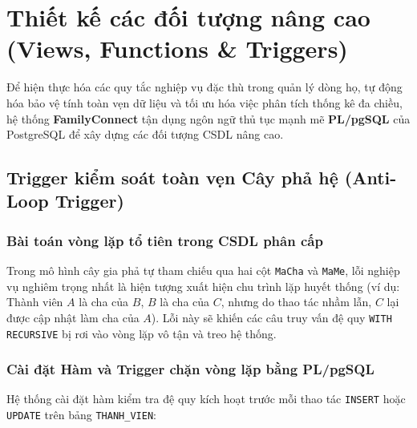 \section{Thiết kế các đối tượng nâng cao (Views, Functions \& Triggers)}
\label{sec:3_4_doi_tuong_nang_cao}

Để hiện thực hóa các quy tắc nghiệp vụ đặc thù trong quản lý dòng họ, tự động hóa bảo vệ tính toàn vẹn dữ liệu và tối ưu hóa việc phân tích thống kê đa chiều, hệ thống \textbf{FamilyConnect} tận dụng ngôn ngữ thủ tục mạnh mẽ \textbf{PL/pgSQL} của PostgreSQL để xây dựng các đối tượng CSDL nâng cao.

\subsection{Trigger kiểm soát toàn vẹn Cây phả hệ (Anti-Loop Trigger)}

\subsubsection{Bài toán vòng lặp tổ tiên trong CSDL phân cấp}
Trong mô hình cây gia phả tự tham chiếu qua hai cột \texttt{MaCha} và \texttt{MaMe}, lỗi nghiệp vụ nghiêm trọng nhất là hiện tượng xuất hiện chu trình lặp huyết thống (ví dụ: Thành viên $A$ là cha của $B$, $B$ là cha của $C$, nhưng do thao tác nhầm lẫn, $C$ lại được cập nhật làm cha của $A$). Lỗi này sẽ khiến các câu truy vấn đệ quy \texttt{WITH RECURSIVE} bị rơi vào vòng lặp vô tận và treo hệ thống.

\subsubsection{Cài đặt Hàm và Trigger chặn vòng lặp bằng PL/pgSQL}
Hệ thống cài đặt hàm kiểm tra đệ quy kích hoạt trước mỗi thao tác \texttt{INSERT} hoặc \texttt{UPDATE} trên bảng \texttt{THANH\_VIEN}:

